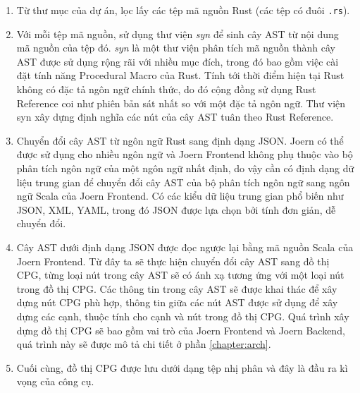 \begin{enumerate}
	\item Từ thư mục của dự án, lọc lấy các tệp mã nguồn Rust (các tệp có đuôi \texttt{.rs}).
	\item Với mỗi tệp mã nguồn, sử dụng thư viện \textit{syn} \cite{synRust} để sinh cây AST từ nội dung mã nguồn của tệp đó.
	\textit{syn} là một thư viện phân tích mã nguồn thành cây AST được sử dụng rộng rãi với nhiều mục đích, trong đó bao gồm việc cài đặt tính năng Procedural Macro \cite{rustlangProceduralMacros} của Rust.
	Tính tới thời điểm hiện tại Rust không có đặc tả ngôn ngữ chính thức, do đó cộng đồng sử dụng Rust Reference \cite{rustReference} coi như phiên bản sát nhất so với một đặc tả ngôn ngữ.
	Thư viện syn xây dựng định nghĩa các nút của cây AST tuân theo Rust Reference.
	\item Chuyển đổi cây AST từ ngôn ngữ Rust sang định dạng JSON.
	Joern có thể được sử dụng cho nhiều ngôn ngữ và Joern Frontend không phụ thuộc vào bộ phân tích ngôn ngữ của một ngôn ngữ nhất định, do vậy cần có định dạng dữ liệu trung gian để chuyển đổi cây AST của bộ phân tích ngôn ngữ sang ngôn ngữ Scala của Joern Frontend.
	Có các kiểu dữ liệu trung gian phổ biến như JSON, XML, YAML, trong đó JSON được lựa chọn bởi tính đơn giản, dễ chuyển đổi.
	\item Cây AST dưới định dạng JSON được đọc ngược lại bằng mã nguồn Scala của Joern Frontend.
	Từ đây ta sẽ thực hiện chuyển đổi cây AST sang đồ thị CPG, từng loại nút trong cây AST sẽ có ánh xạ tương ứng với một loại nút trong đồ thị CPG.
	Các thông tin trong cây AST sẽ được khai thác để xây dựng nút CPG phù hợp, thông tin giữa các nút AST được sử dụng để xây dựng các cạnh, thuộc tính cho cạnh và nút trong đồ thị CPG.
	Quá trình xây dựng đồ thị CPG sẽ bao gồm vai trò của Joern Frontend và Joern Backend, quá trình này sẽ được mô tả chi tiết ở phần \ref{chapter:arch}.
	\item Cuối cùng, đồ thị CPG được lưu dưới dạng tệp nhị phân và đây là đầu ra kì vọng của công cụ.
\end{enumerate}